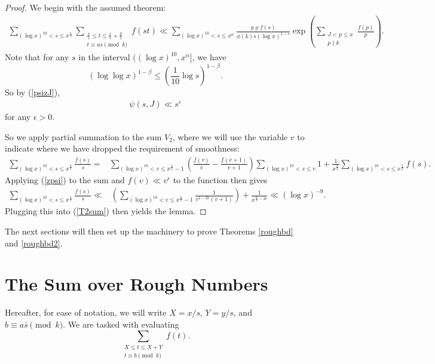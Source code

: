 \documentclass{amsart}
\begin{document}
\begin{proof}
We begin with the assumed theorem:
\begin{gather}\label{T2sum}\sum_{(\log x)^{10}<s\leq x^\frac \alpha 2}\sum_{\substack{\frac xs\leq t\leq \frac xs+\frac ys \\ t\equiv a\overline{s}\pmod k}}f(st)\ll \sum_{(\log x)^{10}<s\leq x^\alpha}\frac{y\varrho f(s)}{\phi(k)s(\log x)^{1-\epsilon}}\exp\left(\sum_{\substack{J<p\leq x \\ p\nmid k}}\frac{f(p)}{p}\right).\end{gather}
Note that for any $s$ in the interval $((\log x)^{10},x^\alpha]$, we have 
$$(\log\log x)^{1-\beta}\leq \left(\frac{1}{10}\log s\right)^{1-\beta}.$$
So by (\ref{psizJ}),
\begin{gather}\label{zpsi}
\psi(s,J)\ll s^{\epsilon}
\end{gather}
for any $\epsilon>0$.

So we apply partial summation to the sum $V_2$, where we will use the variable $v$ to indicate where we have dropped the requirement of smoothness:
\begin{align*}\sum_{(\log x)^{10}<s\leq x^\frac \alpha 2}\frac{f(s)}{s}=&\sum_{(\log x)^{10}<v\leq x^\frac \alpha 2-1}\left(\frac{f(v)}{v}-\frac{f(v+1)}{v+1}\right)\sum_{(\log x)^{10}<s\leq v}1 +\frac{1}{x^{\frac \alpha 2}}\sum_{(\log x)^{10}<s\leq x^\frac \alpha 2}f(s).
\end{align*}
Applying (\ref{zpsi}) to the sum and $f(v)\ll v^\epsilon$ to the function then gives
\begin{align*}\sum_{(\log x)^{10}<s\leq x^\frac \alpha 2}\frac{f(s)}{s}\ll &\left(\sum_{(\log x)^{10}<v\leq x^\frac \alpha 2-1}\frac{1}{v^{1-2\epsilon}(v+1)} \right)+\frac{1}{x^{\frac \alpha 2-2\epsilon}}
\ll (\log x)^{-9}.
\end{align*}
Plugging this into (\ref{T2sum}) then yields the lemma.

\end{proof}

The next sections will then set up the machinery to prove Theorems \ref{roughbd} and \ref{roughbd2}.
\section{The Sum over Rough Numbers}

Hereafter, for ease of notation, we will write $X=x/s$, $Y=y/s$, and $b\equiv a\overline{s}\pmod k$.  We are tasked with evaluating
$$\sum_{\substack{X\leq t\leq X+Y \\ t\equiv b\pmod k}}f(t).$$
\end{document}
